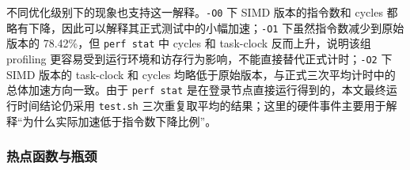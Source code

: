 \documentclass[UTF8,a4paper]{ctexart}
\begin{document}
不同优化级别下的现象也支持这一解释。\texttt{-O0} 下 SIMD 版本的指令数和 cycles 都略有下降，因此可以解释其正式测试中的小幅加速；\texttt{-O1} 下虽然指令数减少到原始版本的 78.42\%，但 \texttt{perf stat} 中 cycles 和 task-clock 反而上升，说明该组 profiling 更容易受到运行环境和访存行为影响，不能直接替代正式计时；\texttt{-O2} 下 SIMD 版本的 task-clock 和 cycles 均略低于原始版本，与正式三次平均计时中的总体加速方向一致。由于 \texttt{perf stat} 是在登录节点直接运行得到的，本文最终运行时间结论仍采用 \texttt{test.sh} 三次重复取平均的结果；这里的硬件事件主要用于解释“为什么实际加速低于指令数下降比例”。

\subsubsection{热点函数与瓶颈}
\end{document}
